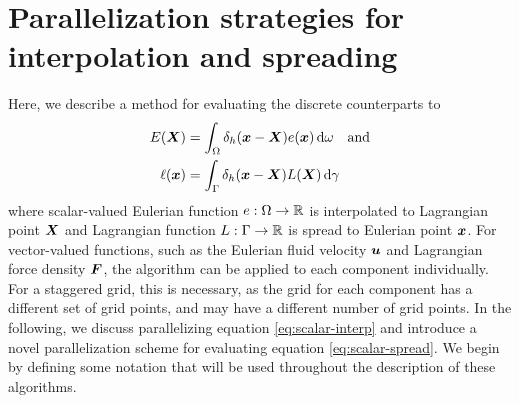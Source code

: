 \section{Parallelization strategies for interpolation and spreading} \label{sec:parallel}

Here, we describe a method for evaluating the discrete counterparts to
\begin{align}
    \label{eq:scalar-interp}
    E(\X) &= \int_\domain \Dirac_h(\x-\X)e(\x) \d\omega \quad \text{and}\\
    \label{eq:scalar-spread}
    \ell(\x) &= \int_\interface \Dirac_h(\x-\X)L(\X) \d\gamma
\end{align}
where scalar-valued Eulerian function $e:\Omega\to\mathbb{R}$ is interpolated to
Lagrangian point $\boldsymbol{X}$ and Lagrangian function $L:\Gamma\to\mathbb{R}$ is spread to
Eulerian point $\boldsymbol{x}$. For vector-valued functions, such as the Eulerian fluid velocity
$\boldsymbol{u}$ and Lagrangian force density $\boldsymbol{F}$, the algorithm can be applied to each component
individually. For a staggered grid, this is necessary, as the grid for each component has
a different set of grid points, and may have a different number of grid points. In the
following, we discuss parallelizing equation \eqref{eq:scalar-interp} and introduce a
novel parallelization scheme for evaluating equation \eqref{eq:scalar-spread}. We begin
by defining some notation that will be used throughout the description of these
algorithms.







